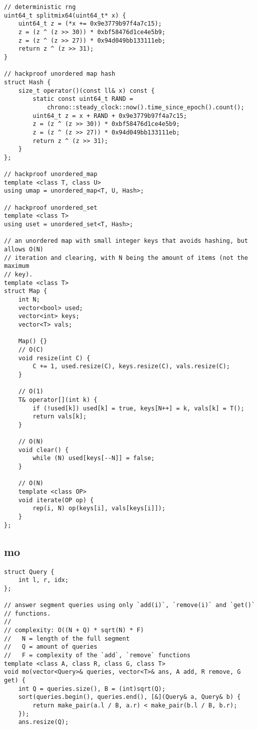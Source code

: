 \documentclass[twoside]{article}
\begin{document}
\begin{multicols*}{2}
\begin{verbatim}
// deterministic rng
uint64_t splitmix64(uint64_t* x) {
    uint64_t z = (*x += 0x9e3779b97f4a7c15);
    z = (z ^ (z >> 30)) * 0xbf58476d1ce4e5b9;
    z = (z ^ (z >> 27)) * 0x94d049bb133111eb;
    return z ^ (z >> 31);
}

// hackproof unordered map hash
struct Hash {
    size_t operator()(const ll& x) const {
        static const uint64_t RAND =
            chrono::steady_clock::now().time_since_epoch().count();
        uint64_t z = x + RAND + 0x9e3779b97f4a7c15;
        z = (z ^ (z >> 30)) * 0xbf58476d1ce4e5b9;
        z = (z ^ (z >> 27)) * 0x94d049bb133111eb;
        return z ^ (z >> 31);
    }
};

// hackproof unordered_map
template <class T, class U>
using umap = unordered_map<T, U, Hash>;

// hackproof unordered_set
template <class T>
using uset = unordered_set<T, Hash>;

// an unordered map with small integer keys that avoids hashing, but allows O(N)
// iteration and clearing, with N being the amount of items (not the maximum
// key).
template <class T>
struct Map {
    int N;
    vector<bool> used;
    vector<int> keys;
    vector<T> vals;

    Map() {}
    // O(C)
    void resize(int C) {
        C += 1, used.resize(C), keys.resize(C), vals.resize(C);
    }

    // O(1)
    T& operator[](int k) {
        if (!used[k]) used[k] = true, keys[N++] = k, vals[k] = T();
        return vals[k];
    }

    // O(N)
    void clear() {
        while (N) used[keys[--N]] = false;
    }

    // O(N)
    template <class OP>
    void iterate(OP op) {
        rep(i, N) op(keys[i], vals[keys[i]]);
    }
};
\end{verbatim}

{
\subsection*{mo}
}
\begin{verbatim}
struct Query {
    int l, r, idx;
};

// answer segment queries using only `add(i)`, `remove(i)` and `get()`
// functions.
//
// complexity: O((N + Q) * sqrt(N) * F)
//   N = length of the full segment
//   Q = amount of queries
//   F = complexity of the `add`, `remove` functions
template <class A, class R, class G, class T>
void mo(vector<Query>& queries, vector<T>& ans, A add, R remove, G get) {
    int Q = queries.size(), B = (int)sqrt(Q);
    sort(queries.begin(), queries.end(), [&](Query& a, Query& b) {
        return make_pair(a.l / B, a.r) < make_pair(b.l / B, b.r);
    });
    ans.resize(Q);


\end{verbatim}
\end{multicols*}
\end{document}
